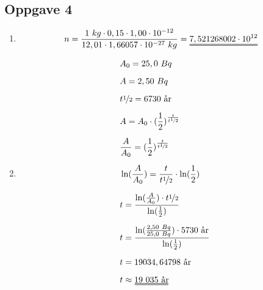\documentclass[11pt,a4paper]{report}
\newcommand{\opgd}[1]{\item[#1)]}
\newcommand{\opg}[1]{\subsection*{Oppgave #1}}
\begin{document}
\newpage
\opg{4}
\begin{enumerate}[leftmargin=*,itemsep=1cm,labelsep=2em,label=\alph*)]
\opgd{a}
\begin{align*}
&n = \frac{1\ kg \cdot 0,15 \cdot 1,00 \cdot 10^{-12}}{12,01 \cdot 1,66057 \cdot 10^{-27}\ kg} = \uuline{7,521268002 \cdot 10^{12}}
\end{align*}
\opgd{b}
\begin{align*}
&A_0 = 25,0\ Bq\\[0.2cm]
&A = 2,50\ Bq\\[0.2cm]
&t\nicefrac{1}{2} = 6730\ \text{år}\\[0.2cm]
&A = A_0 \cdot (\frac{1}{2})^{\frac{t}{t\nicefrac{1}{2}}}\\[0.2cm]
&\frac{A}{A_0} = (\frac{1}{2})^{\frac{t}{t\nicefrac{1}{2}}}\\[0.2cm]
&\ln(\frac{A}{A_0}) = \frac{t}{t\nicefrac{1}{2}} \cdot \ln(\frac{1}{2})\\[0.2cm]
&t = \frac{\ln(\frac{A}{A_0}) \cdot t\nicefrac{1}{2}}{\ln(\frac{1}{2})}\\[0.2cm]
&t = \frac{\ln(\frac{2,50\ Bq}{25,0\ Bq}) \cdot 5730\ \text{år}}{\ln(\frac{1}{2})}\\[0.2cm]
&t = 19034,64798\ \text{år}\\[0.2cm]
&t \approx \uuline{19\ 035\ \text{år}}
\end{align*}
\end{enumerate}

\end{document}
